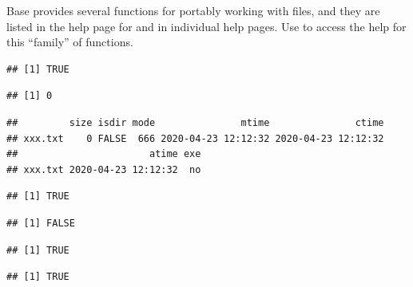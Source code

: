 \documentclass[krantz2]{krantz}\usepackage{knitr}
\begin{document}
Base \Rlang provides several functions for portably working with files, and they are listed in the help page for  and in individual help pages. Use  to access the help for this ``family'' of functions.

\begin{knitrout}\footnotesize
{}\color{fgcolor}\begin{kframe}
\begin{alltt}
 \hlstd{(}\hlopt{!}\hlstd{(}\hlstd{)) \{}
  \hlstd{(}\hlstd{)}
\hlstd{\}}
\end{alltt}
\begin{verbatim}
## [1] TRUE
\end{verbatim}
\begin{alltt}
\hlstd{(}\hlstd{)}
\end{alltt}
\begin{verbatim}
## [1] 0
\end{verbatim}
\begin{alltt}
\hlstd{(}\hlstd{)}
\end{alltt}
\begin{verbatim}
##         size isdir mode               mtime               ctime
## xxx.txt    0 FALSE  666 2020-04-23 12:12:32 2020-04-23 12:12:32
##                       atime exe
## xxx.txt 2020-04-23 12:12:32  no
\end{verbatim}
\begin{alltt}
\hlstd{(}\hlstd{,} \hlstd{)}
\end{alltt}
\begin{verbatim}
## [1] TRUE
\end{verbatim}
\begin{alltt}
\hlstd{(}\hlstd{)}
\end{alltt}
\begin{verbatim}
## [1] FALSE
\end{verbatim}
\begin{alltt}
\hlstd{(}\hlstd{)}
\end{alltt}
\begin{verbatim}
## [1] TRUE
\end{verbatim}
\begin{alltt}
\hlstd{(}\hlstd{)}
\end{alltt}
\begin{verbatim}
## [1] TRUE
\end{verbatim}
\end{kframe}
\end{knitrout}
\end{document}
